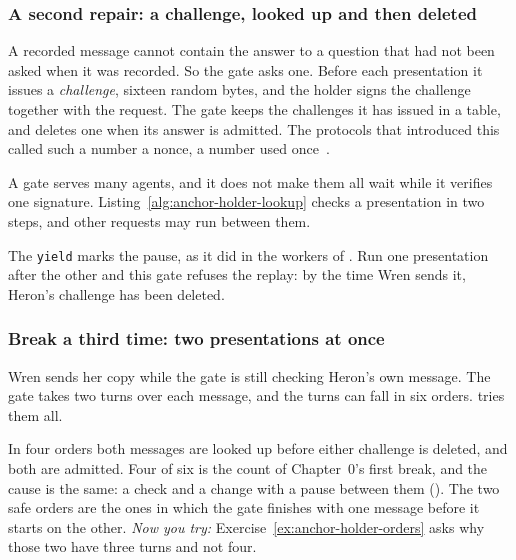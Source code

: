 \subsubsection{A second repair: a challenge, looked up and then deleted}

A recorded message cannot contain the answer to a question that had not
been asked when it was recorded. So the gate asks one. Before each
presentation it issues a \emph{challenge}, sixteen random bytes, and the
holder signs the challenge together with the request. The gate keeps the
challenges it has issued in a table, and deletes one when its answer is
admitted. The protocols that introduced this called such a number a nonce, a
number used once~.

A gate serves many agents, and it does not make them all wait while it
verifies one signature. Listing~\ref{alg:anchor-holder-lookup} checks a
presentation in two steps, and other requests may run between them.


The \texttt{yield} marks the pause, as it did in the workers of
. Run one presentation after the other
and this gate refuses the replay: by the time Wren sends it, Heron's
challenge has been deleted.

\subsubsection{Break a third time: two presentations at once}

Wren sends her copy while the gate is still checking Heron's own message.
The gate takes two turns over each message, and the turns can fall in six
orders. \pdkernelname{} tries them all.


In four orders both messages are looked up before either challenge is
deleted, and both are admitted. Four of six is the count of
Chapter~0's first break, and the cause is the same: a check and a change
with a pause between them
(). The two safe orders are
the ones in which the gate finishes with one message before it starts on
the other. \emph{Now you try:} Exercise~\ref{ex:anchor-holder-orders} asks
why those two have three turns and not four.

